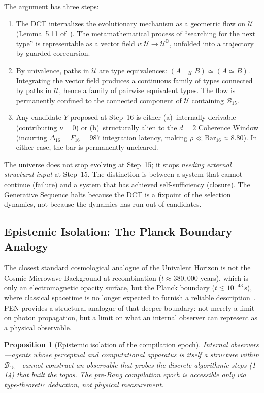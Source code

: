 \documentclass[11pt,a4paper]{article}
\theoremstyle{plain}
\newtheorem{proposition}[theorem]{Proposition}
\theoremstyle{definition}
\theoremstyle{remark}
\newcommand{\D}{\mathbb{D}}
\newcommand{\U}{\mathcal{U}}
\newcommand{\B}{\mathcal{B}}
\begin{document}
The argument has three steps:
\begin{enumerate}[nosep]
    \item The DCT internalizes the evolutionary mechanism as a geometric flow on $\U$ (Lemma~5.11 of~\cite{pen}).
    The metamathematical process of ``searching for the next type'' is representable as a vector field $v : \U \to \U^{\D}$, unfolded into a trajectory by guarded corecursion.
    \item By univalence, paths in $\U$ are type equivalences: $(A =_{\U} B) \simeq (A \simeq B)$.
    Integrating the vector field produces a continuous family of types connected by paths in $\U$, hence a family of pairwise equivalent types.
    The flow is permanently confined to the connected component of $\U$ containing $\B_{15}$.
    \item Any candidate $Y$ proposed at Step~16 is either (a)~internally derivable (contributing $\nu = 0$) or (b)~structurally alien to the $d = 2$ Coherence Window (incurring $\Delta_{16} = F_{16} = 987$ integration latency, making $\rho \ll \mathrm{Bar}_{16} \approx 8.80$).
    In either case, the bar is permanently uncleared.
\end{enumerate}

The universe does not stop evolving at Step~15; it stops \emph{needing external structural input} at Step~15.
The distinction is between a system that cannot continue (failure) and a system that has achieved self-sufficiency (closure).
The Generative Sequence halts because the DCT is a fixpoint of the selection dynamics, not because the dynamics has run out of candidates.

\subsection{Epistemic Isolation: The Planck Boundary Analogy}
\label{sec:epistemic}

The closest standard cosmological analogue of the Univalent Horizon is not the Cosmic Microwave Background at recombination ($t \approx 380{,}000$ years), which is only an electromagnetic opacity surface, but the Planck boundary ($t \lesssim 10^{-43}\,\mathrm{s}$), where classical spacetime is no longer expected to furnish a reliable description~\cite{mukhanov}.
PEN provides a structural analogue of that deeper boundary: not merely a limit on photon propagation, but a limit on what an internal observer can represent as a physical observable.

\begin{proposition}[Epistemic isolation of the compilation epoch]
\label{prop:epistemic}
Internal observers---agents whose perceptual and computational apparatus is itself a structure within $\B_{15}$---cannot construct an observable that probes the discrete algorithmic steps (1--14) that built the topos.
The pre-Bang compilation epoch is accessible only via type-theoretic deduction, not physical measurement.
\end{proposition}
\end{document}
